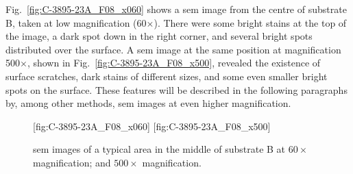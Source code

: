 


Fig.~\ref{fig:C-3895-23A_F08_x060} shows a \ac{sem} image from the centre of substrate B, taken at low magnification (60$\times$). There were some bright stains at the top of the image, a dark spot down in the right corner, and several bright spots distributed over the surface. A \ac{sem} image at the same position at magnification 500$\times$, shown in Fig.~\ref{fig:C-3895-23A_F08_x500}, revealed the existence of surface scratches, dark stains of different sizes, and some even smaller bright spots on the surface. These features will be described in the following paragraphs by, among other methods, \ac{sem} images at even higher magnification.

\begin{figure}[htbp]
    \centering
    [fig:C-3895-23A_F08_x060]
    \hfill
    [fig:C-3895-23A_F08_x500]
    \caption[\Ac{sem} images of a typical area in the middle of substrate B.]{\Ac{sem} images of a typical area in the middle of substrate B at  $60\times$ magnification; and  $500\times$ magnification.}
    \label{fig:SEM_C389523_overview}
\end{figure}

